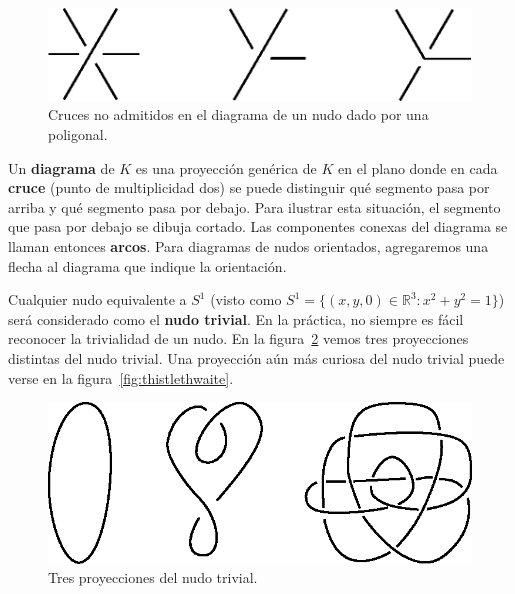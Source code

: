\documentclass[graybox]{svmult}
\newcommand{\R}{\mathbb{R}}
\begin{document}
	\begin{figure}[ht]
        \centering
    	\includegraphics[scale=0.6]{images/wrongcrossings}
        \caption{Cruces no admitidos en el diagrama de un nudo dado por una
        poligonal.}
        \label{fig:wrong_crossings}
    \end{figure}
   
    Un \textbf{diagrama} de $K$ es una proyección genérica de $K$ en el plano
    donde en cada \textbf{cruce} (punto de multiplicidad dos) se puede
    distinguir qué segmento pasa por arriba y qué segmento pasa por debajo.
    Para ilustrar esta situación, el segmento que pasa por debajo se dibuja
    cortado.  Las componentes conexas del diagrama se llaman entonces
    \textbf{arcos}. Para diagramas de nudos orientados, agregaremos una flecha
    al diagrama que indique la orientación.

    Cualquier nudo equivalente a $S^1$ (visto como $S^1=\{(x,y,0)\in\R^3:x^2+y^2=1\}$) 
    será considerado como el \textbf{nudo
    trivial}.  En la práctica, no siempre es fácil reconocer la trivialidad de
    un nudo. En la figura~\ref{fig:trivial} vemos tres proyecciones distintas
    del nudo trivial. Una proyección aún más curiosa del nudo trivial puede
    verse en la figura~\ref{fig:thistlethwaite}.

    \begin{figure}[ht]
		\centering
    	\includegraphics[scale=0.6]{images/unknots}
        \caption{Tres proyecciones del nudo trivial.}
        \label{fig:trivial}
	\end{figure}
	
\end{document}
